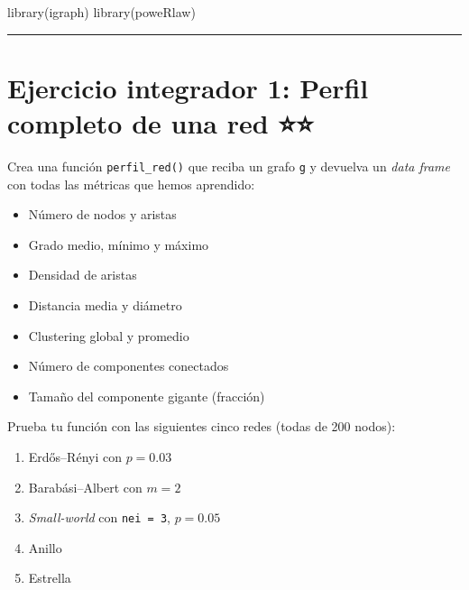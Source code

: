 \documentclass[
  letterpaper,
  DIV=11,
  numbers=noendperiod]{scrreprt}
\newenvironment{Shaded}{\begin{snugshade}}{\end{snugshade}}
\newcommand{\FunctionTok}[1]{\textcolor[rgb]{0.28,0.35,0.67}{#1}}
\newcommand{\NormalTok}[1]{\textcolor[rgb]{0.00,0.23,0.31}{#1}}
\providecommand{\tightlist}{%
  \setlength{\itemsep}{0pt}\setlength{\parskip}{0pt}}
\begin{document}
\begin{Shaded}
\begin{Highlighting}[]
\FunctionTok{library}\NormalTok{(igraph)}
\FunctionTok{library}\NormalTok{(poweRlaw)}
\end{Highlighting}
\end{Shaded}

\begin{center}\rule{0.5\linewidth}{0.5pt}\end{center}

\section*{Ejercicio integrador 1: Perfil completo de una red
⭐⭐}\label{ejercicio-integrador-1-perfil-completo-de-una-red}


Crea una función \texttt{perfil\_red()} que reciba un grafo \texttt{g} y
devuelva un \emph{data frame} con todas las métricas que hemos
aprendido:

\begin{itemize}
\tightlist
\item
  Número de nodos y aristas
\item
  Grado medio, mínimo y máximo
\item
  Densidad de aristas
\item
  Distancia media y diámetro
\item
  Clustering global y promedio
\item
  Número de componentes conectados
\item
  Tamaño del componente gigante (fracción)
\end{itemize}

Prueba tu función con las siguientes cinco redes (todas de 200 nodos):

\begin{enumerate}
\def\labelenumi{\arabic{enumi}.}
\tightlist
\item
  Erdős--Rényi con \(p = 0.03\)
\item
  Barabási--Albert con \(m = 2\)
\item
  \emph{Small-world} con \texttt{nei\ =\ 3}, \(p = 0.05\)
\item
  Anillo
\item
  Estrella
\end{enumerate}
\end{document}
